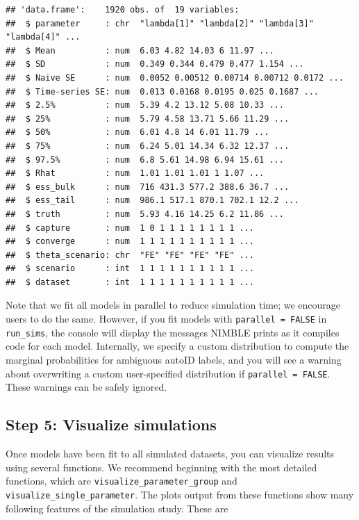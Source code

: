 \documentclass[
]{article}
\begin{document}
\begin{verbatim}
## 'data.frame':    1920 obs. of  19 variables:
##  $ parameter     : chr  "lambda[1]" "lambda[2]" "lambda[3]" "lambda[4]" ...
##  $ Mean          : num  6.03 4.82 14.03 6 11.97 ...
##  $ SD            : num  0.349 0.344 0.479 0.477 1.154 ...
##  $ Naive SE      : num  0.0052 0.00512 0.00714 0.00712 0.0172 ...
##  $ Time-series SE: num  0.013 0.0168 0.0195 0.025 0.1687 ...
##  $ 2.5%          : num  5.39 4.2 13.12 5.08 10.33 ...
##  $ 25%           : num  5.79 4.58 13.71 5.66 11.29 ...
##  $ 50%           : num  6.01 4.8 14 6.01 11.79 ...
##  $ 75%           : num  6.24 5.01 14.34 6.32 12.37 ...
##  $ 97.5%         : num  6.8 5.61 14.98 6.94 15.61 ...
##  $ Rhat          : num  1.01 1.01 1.01 1 1.07 ...
##  $ ess_bulk      : num  716 431.3 577.2 388.6 36.7 ...
##  $ ess_tail      : num  986.1 517.1 870.1 702.1 12.2 ...
##  $ truth         : num  5.93 4.16 14.25 6.2 11.86 ...
##  $ capture       : num  1 0 1 1 1 1 1 1 1 1 ...
##  $ converge      : num  1 1 1 1 1 1 1 1 1 1 ...
##  $ theta_scenario: chr  "FE" "FE" "FE" "FE" ...
##  $ scenario      : int  1 1 1 1 1 1 1 1 1 1 ...
##  $ dataset       : int  1 1 1 1 1 1 1 1 1 1 ...
\end{verbatim}

\linespread{1}

Note that we fit all models in parallel to reduce simulation time; we encourage users to do the same. However, if you fit models with \texttt{parallel\ =\ FALSE} in \texttt{run\_sims}, the console will display the messages NIMBLE prints as it compiles code for each model. Internally, we specify a custom distribution to compute the marginal probabilities for ambiguous autoID labels, and you will see a warning about overwriting a custom user-specified distribution if \texttt{parallel\ =\ FALSE}. These warnings can be safely ignored.

\subsection{\texorpdfstring{Step 5: Visualize simulations \label{viz}}{Step 5: Visualize simulations }}\label{step-5-visualize-simulations}

Once models have been fit to all simulated datasets, you can visualize results using several functions. We recommend beginning with the most detailed functions, which are \texttt{visualize\_parameter\_group} and \texttt{visualize\_single\_parameter}. The plots output from these functions show many following features of the simulation study. These are
\end{document}
